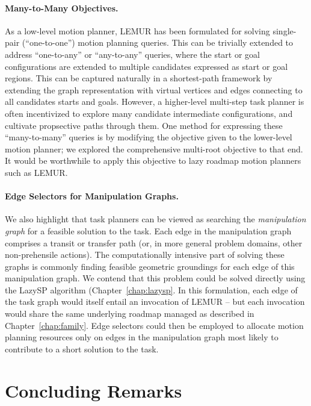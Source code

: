 \paragraph{Many-to-Many Objectives.}
As a low-level motion planner,
LEMUR has been formulated for solving single-pair
(``one-to-one'') motion planning queries.
This can be trivially extended to address ``one-to-any''
or ``any-to-any'' queries, where the start or goal configurations are
extended to multiple candidates expressed as start or goal regions.
This can be captured naturally in a shortest-path framework by extending
the graph representation with virtual vertices and edges connecting
to all candidates starts and goals.
However, a higher-level multi-step task planner is often incentivized
to explore many candidate intermediate configurations,
and cultivate propsective paths through them.
One method for expressing these ``many-to-many'' queries is by
modifying the objective given to the lower-level motion planner;
we explored the comprehensive multi-root objective
\citep{dellin2015cmr} to that end.
It would be worthwhile to apply this objective to lazy roadmap motion
planners such as LEMUR.

\paragraph{Edge Selectors for Manipulation Graphs.}
We also highlight that task planners can be viewed as searching
the \emph{manipulation graph} \citep{simeon2004manipulation}
for a feasible solution to the task.
Each edge in the manipulation graph comprises a transit or transfer
path
(or, in more general problem domains, other non-prehensile actions).
The computationally intensive part of solving these graphs is
commonly finding feasible geometric groundings for each edge of this
manipulation graph.
We contend that this problem could be solved directly using the LazySP
algorithm (Chapter~\ref{chap:lazysp}.
In this formulation,
each edge of the task graph would itself entail an invocation of LEMUR
-- but each invocation would share the same underlying roadmap
managed as described in Chapter~\ref{chap:family}.
Edge selectors could then be employed to allocate motion planning
resources only on edges in the manipulation graph
most likely to contribute to a short solution to the task.

\section{Concluding Remarks}
\label{sec:conclusion:remarks}


